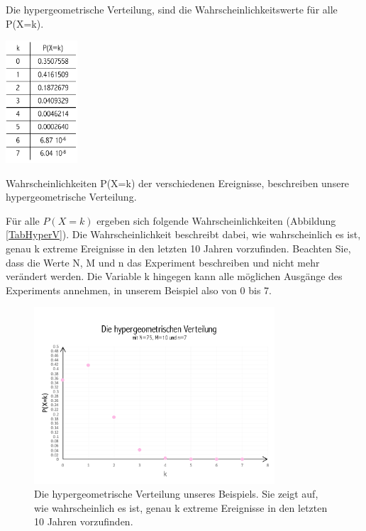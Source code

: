 \begin{refsection}
\begin{definition}
Die hypergeometrische Verteilung, sind die Wahrscheinlichkeitswerte für alle P(X=k).
\end{definition}

\begin{table}
\centering
\includegraphics[width=0.2\textwidth]{extrem/TabHyperV.pdf}
\caption{Wahrscheinlichkeiten P(X=k) der verschiedenen Ereignisse, beschreiben unsere hypergeometrische Verteilung.}
\label{TabHyperV}
\end{table}

Für alle $P (X=k)$ ergeben sich folgende Wahrscheinlichkeiten (Abbildung \ref{TabHyperV}). Die Wahrscheinlichkeit beschreibt dabei, wie wahrscheinlich es ist, genau k extreme Ereignisse in den letzten 10 Jahren vorzufinden.
Beachten Sie, dass die Werte N, M und n das Experiment beschreiben und nicht mehr verändert werden. Die Variable k hingegen kann alle möglichen Ausgänge des Experiments annehmen, in unserem Beispiel also von 0 bis 7.

\begin{figure}
\centering
\includegraphics[width=0.8\textwidth]{extrem/HyperV.pdf}
\caption{Die hypergeometrische Verteilung unseres Beispiels. Sie zeigt auf, wie wahrscheinlich es ist, genau k extreme Ereignisse in den letzten 10 Jahren vorzufinden.}
\label{HyperV}
\end{figure}


\end{refsection}
